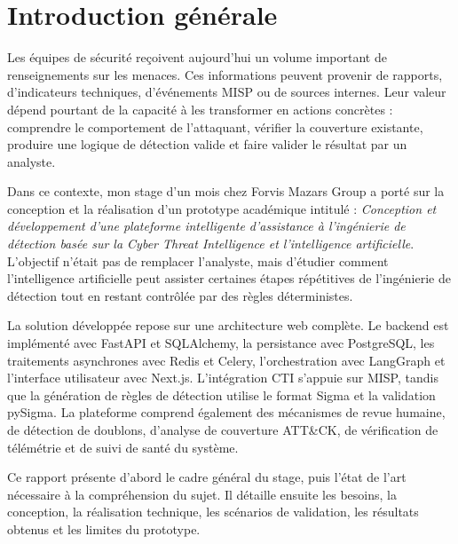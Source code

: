 \chapter*{Introduction générale}

Les équipes de sécurité reçoivent aujourd'hui un volume important de renseignements sur les menaces. Ces informations peuvent provenir de rapports, d'indicateurs techniques, d'événements MISP ou de sources internes. Leur valeur dépend pourtant de la capacité à les transformer en actions concrètes : comprendre le comportement de l'attaquant, vérifier la couverture existante, produire une logique de détection valide et faire valider le résultat par un analyste.

Dans ce contexte, mon stage d'un mois chez Forvis Mazars Group a porté sur la conception et la réalisation d'un prototype académique intitulé : \textit{Conception et développement d'une plateforme intelligente d'assistance à l'ingénierie de détection basée sur la Cyber Threat Intelligence et l'intelligence artificielle}. L'objectif n'était pas de remplacer l'analyste, mais d'étudier comment l'intelligence artificielle peut assister certaines étapes répétitives de l'ingénierie de détection tout en restant contrôlée par des règles déterministes.

La solution développée repose sur une architecture web complète. Le backend est implémenté avec FastAPI et SQLAlchemy, la persistance avec PostgreSQL, les traitements asynchrones avec Redis et Celery, l'orchestration avec LangGraph et l'interface utilisateur avec Next.js. L'intégration CTI s'appuie sur MISP, tandis que la génération de règles de détection utilise le format Sigma et la validation pySigma. La plateforme comprend également des mécanismes de revue humaine, de détection de doublons, d'analyse de couverture ATT\&CK, de vérification de télémétrie et de suivi de santé du système.

Ce rapport présente d'abord le cadre général du stage, puis l'état de l'art nécessaire à la compréhension du sujet. Il détaille ensuite les besoins, la conception, la réalisation technique, les scénarios de validation, les résultats obtenus et les limites du prototype.
